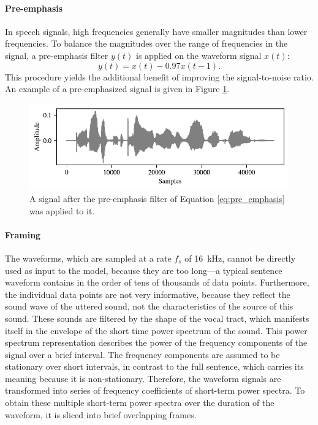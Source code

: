 		\paragraph{Pre-emphasis}

			In speech signals, high frequencies generally have smaller magnitudes than lower frequencies.
			To balance the magnitudes over the range of frequencies in the signal, a pre-emphasis filter $y(t)$ is applied on the waveform signal $x(t)$:
			\begin{equation}\label{eq:pre_emphasis}
				y(t) = x(t) - 0.97x(t-1).
			\end{equation}
			This procedure yields the additional benefit of improving the signal-to-noise ratio.
			An example of a pre-emphasized signal is given in Figure \ref{fig:signalemph}.
			\begin{figure}[ht]
				\centering
			    \includegraphics[width=\linewidth]{gfx/signalemph}
			    \caption[Pre-emphasis filtered signal]{A signal after the pre-emphasis filter of Equation \ref{eq:pre_emphasis} was applied to it.}
			    \label{fig:signalemph}
			\end{figure}

		\paragraph{Framing}
			The waveforms, which are sampled at a rate $f_s$ of \SI{16}{\kHz}, cannot be directly used as input to the model, because they are too long---a typical sentence waveform contains in the order of tens of thousands of data points.
			Furthermore, the individual data points are not very informative, because they reflect the sound wave of the uttered sound, not the characteristics of the source of this sound.
			These sounds are filtered by the shape of the vocal tract, which manifests itself in the envelope of the short time power spectrum of the sound.
			This power spectrum representation describes the power of the frequency components of the signal over a brief interval.
			The frequency components are assumed to be stationary over short intervals, in contrast to the full sentence, which carries its meaning because it is non-stationary.
			Therefore, the waveform signals are transformed into series of frequency coefficients of short-term power spectra.
			To obtain these multiple short-term power spectra over the duration of the waveform, it is sliced into brief overlapping frames.

